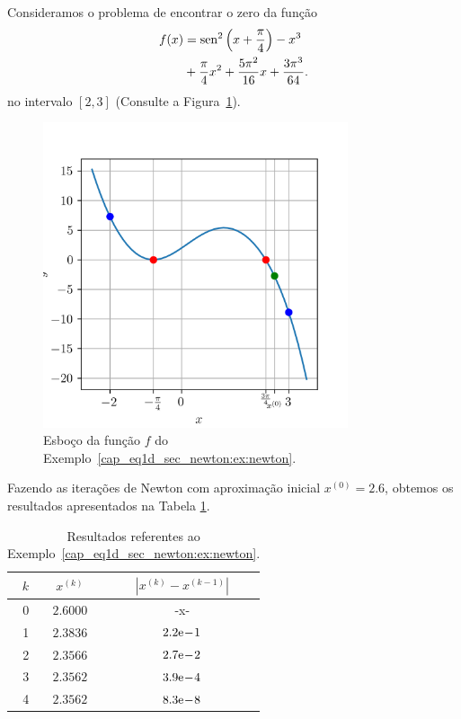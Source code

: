 \begin{ex}\label{cap_eq1d_sec_newton:ex:newton}
  Consideramos o problema de encontrar o zero da função
  \begin{equation}
    \begin{aligned}
      f(x) &= \operatorname{sen}^2\left(x+\frac{\pi}{4}\right) - x^3 \\
      &+ \frac{\pi}{4}x^2 + \frac{5\pi^2}{16}x + \frac{3\pi^3}{64}.
    \end{aligned}
  \end{equation}
  no intervalo $[2, 3]$ (Consulte a Figura~\ref{cap_eq1d_sec_newton:fig:newton_ex}).

  \begin{figure}[H]
    \centering
    \includegraphics[width=0.8\textwidth]{./cap_eq1d/dados/fig_newton_ex/fig}
    \caption{Esboço da função $f$ do Exemplo~\ref{cap_eq1d_sec_newton:ex:newton}.}
  \label{cap_eq1d_sec_newton:fig:newton_ex}
\end{figure}


  Fazendo as iterações de Newton com aproximação inicial $x^{(0)}=2.6$, obtemos os resultados apresentados na Tabela \ref{tab:ex_Newton_exec}.

  \begin{table}[h!]
    \centering
    \caption{Resultados referentes ao Exemplo~\ref{cap_eq1d_sec_newton:ex:newton}.}
    \label{tab:ex_Newton_exec}
    \begin{tabular}{r|cc}
      $k$ & $x^{(k)}$ & $|x^{(k)}-x^{(k-1)}|$ \\\hline
      0 & $2.6000$ & -x-\\
      1 & $2.3836$ & $2.2\mathrm{e}\!-\!1$ \\
      2 & $2.3566$ & $2.7\mathrm{e}\!-\!2$ \\
      3 & $2.3562$ & $3.9\mathrm{e}\!-\!4$ \\
      4 & $2.3562$ & $8.3\mathrm{e}\!-\!8$ \\\hline
    \end{tabular}
  \end{table}


\end{ex}
